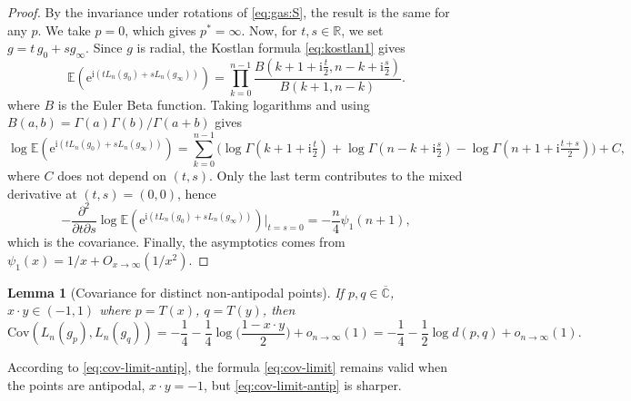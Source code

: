\documentclass[10pt,reqno]{amsart}
\numberwithin{equation}{section}
\numberwithin{figure}{section}
\theoremstyle{plain}
\newtheorem{lemma}[theorem]{Lemma}
\newcommand{\<}{\langle}
\renewcommand{\>}{\rangle}
\begin{document}
\begin{proof}
  By the invariance 
  under rotations of \eqref{eq:gas:S}, the result is the
  same for any $p$. We take $p=0$, which gives $p^*=\infty$. Now, for
  $t,s\in\mathbb{R}$, we set $g=t\,g_0+sg_\infty$. Since $g$ is radial, the
  Kostlan formula \eqref{eq:kostlan1} gives 
  \begin{equation}
    \mathbb{E}(\mathrm{e}^{\mathrm{i}(tL_n(g_0)+sL_n(g_\infty))})
    =\prod_{k=0}^{n-1}\frac{B(k+1+\mathrm{i}\frac{t}{2},n-k+\mathrm{i}\frac{s}{2})}{B(k+1,n-k)}.
  \end{equation}
  where $B$ is the Euler Beta function. Taking logarithms and using $B(a,b)=\Gamma(a)\Gamma(b)/\Gamma(a+b)$ gives
  \begin{equation}
    \log\mathbb{E}(\mathrm{e}^{\mathrm{i}(tL_n(g_0)+sL_n(g_\infty))})
    =\sum_{k=0}^{n-1}\Big(\log\Gamma(k+1+\mathrm{i}\tfrac{t}{2})+\log\Gamma(n-k+\mathrm{i}\tfrac{s}{2})-\log\Gamma(n+1+\mathrm{i}\tfrac{t+s}{2})
    \Big)+C,
  \end{equation}
  where $C$ does not depend on $(t,s)$. Only the last term contributes to the
  mixed derivative at $(t,s)=(0,0)$, hence
  \begin{equation}
    -\frac{\partial^2}{\partial t\partial s}
    \log \mathbb{E}(\mathrm{e}^{\mathrm{i}(tL_n(g_0)+sL_n(g_\infty))})\Big|_{t=s=0}
    = -\frac{n}{4}\psi_1(n+1),
  \end{equation}
  which is the covariance. Finally, the asymptotics comes from $\psi_1(x)=1/x+O_{x\to\infty}(1/x^2)$.
\end{proof}

\begin{lemma}[Covariance for distinct non-antipodal points]\label{le:cov-nonantipodal}
  If $p,q\in\overline{\mathbb{C}}$, $x\cdot y\in(-1,1)$ where $p=T(x)$, $q=T(y)$, then 
  \begin{equation}\label{eq:cov-limit}
    \mathrm{Cov}(L_n(g_p),L_n(g_q))
    =-\frac14-\frac14\log\Big(\frac{1-x\cdot y}{2}\Big)+o_{n\to\infty}(1)
    =-\frac14-\frac12\log d(p,q)+o_{n\to\infty}(1).
  \end{equation}
\end{lemma}

%

According to \eqref{eq:cov-limit-antip}, the formula \eqref{eq:cov-limit}
remains valid when the points are antipodal,
$x \cdot y = -1$, but \eqref{eq:cov-limit-antip}
is sharper.
\end{document}
